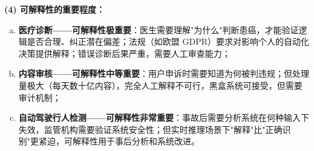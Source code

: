 \documentclass[a4paper,11pt]{ctexart}
\begin{document}
\begin{solutionbox}[参考答案与详细解析]
    \textbf{(4) 可解释性的重要程度：}

    \begin{enumerate}[a.]
        \item \textbf{医疗诊断——可解释性极重要}：医生需要理解"为什么"判断患癌，才能验证逻辑是否合理、纠正潜在偏差；法规（如欧盟 GDPR）要求对影响个人的自动化决策提供解释；错误诊断后果严重，需要人工审查能力；
        \item \textbf{内容审核——可解释性中等重要}：用户申诉时需要知道为何被判违规；但处理量极大（每天数十亿内容），完全人工解释不可行，黑盒系统可接受，但需要审计机制；
        \item \textbf{自动驾驶行人检测——可解释性非常重要}：事故后需要分析系统在何种输入下失效，监管机构需要验证系统安全性；但实时推理场景下"解释"比"正确识别"更紧迫，可解释性用于事后分析和系统改进。
    \end{enumerate}
\end{solutionbox}
\end{document}
